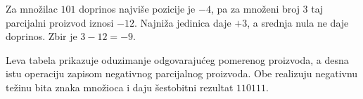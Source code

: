Za množilac $101$ doprinos najviše pozicije je $-4$, pa za množeni broj 3 taj parcijalni proizvod iznosi $-12$. Najniža jedinica daje $+3$, a srednja nula ne daje doprinos. Zbir je $3-12=-9$.

Leva tabela prikazuje oduzimanje odgovarajućeg pomerenog proizvoda, a desna istu operaciju zapisom negativnog parcijalnog proizvoda. Obe realizuju negativnu težinu bita znaka množioca i daju šestobitni rezultat $110111$.
